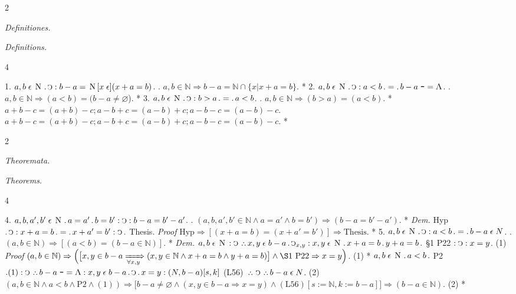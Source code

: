\documentclass{book}
\newcommand{\s}{\switchcolumn} %
\newcommand{\C}{\mathop{\sbox0{$\displaystyle$$\reflectbox{C}$} %
\raisebox{-\height+\ht0-0.05cm}[\ht0][\dp0]{\scalebox{0.8}[0.8]{\copy0}}}\displaylimits} %
\newcommand{\p}{\mathop{\sbox0{$\displaystyle$$.$}
\raisebox{-\height+\ht0}[\ht0][\dp0]{\scalebox{1}[1]{\copy0}}}\displaylimits} %
\newcommand{\pppNoSpace}{\leavevmode\lower0ex\hbox{.}\kern-0.1em\raise0.7ex\hbox{.}\kern-0.1em\lower0ex\hbox{.}} %
\newcommand{\ppp}{\thinspace \pppNoSpace\thinspace} %
\newcommand{\no}{\mathop{\thinspace \scalebox{1.5}{-}}}
\newcommand{\abs}{\mathop{\rotatebox[origin=c]{180}{V}}}
\newcommand{\smallIn}{\ensuremath{\mathrel{\epsilon}}}
\newcommand{\N}{\mathop{\thinspace \text{N} \thinspace}}
\renewcommand{\rightarrow}{\Rightarrow}
\renewcommand{\xrightarrow}{\xRightarrow}
\newcommand\peanoHeadingSmall[1]{ \vspace{0.75cm} \textit{#1} \nopagebreak[4]

\vspace{0.25cm} \nopagebreak[1]}
\newenvironment{translateTwoCol}
               { %
                 \columnratio{0.5, 0.5}
                 \begin{paracol}{2}
                 \newcommand{\LAT}{\switchcolumn[0]*}
                 \newcommand{\ENG}{\switchcolumn[1]}
               }
               { %
                 \let\ENG\undefined
                 \let\LAT\undefined
                 \end{paracol}
               }
\newenvironment{translateFourCol}[4]
               { %
                 \setcolumnwidth{#1\fill/1em, #2\fill/\columnsep, #3\fill/1em, #4\fill}
                 \begin{paracol}{4}
                 \newcommand{\LAT}{\switchcolumn[0]*}
                 \newcommand{\ENG}{\switchcolumn[2]}
               }
               { %
                 \let\ENG\undefined
                 \let\LAT\undefined
                 \end{paracol}
               }
\begin{document}
\begin{translateTwoCol}
\centering
{}
{}
\peanoHeadingSmall{Definitiones.}
\ENG
\peanoHeadingSmall{Definitions.}
\end{translateTwoCol}

\begin{translateFourCol}{0.08}{0.42}{0.08}{0.42}
\raggedright
1. \s $a,b \smallIn \N \p \C : b - a = \N [x \smallIn] (x + a = b)$.
\ENG
1. \s $a,b \in \mathbb{N} \rightarrow b - a = \mathbb{N} \cap \{x | x + a = b \}$.
\LAT
2. \s $a,b \smallIn \N \p \C : a < b \p = \p b - a \no = \abs$.
\ENG
2. \s $a,b \in \mathbb{N} \rightarrow (a < b) = (b - a \neq \varnothing$).
\LAT
3. \s $a,b \smallIn \N \p \C : b > a \p = \p a < b$.
\ENG
3. \s $a,b \in \mathbb{N} \rightarrow (b > a) = (a < b)$.
\LAT
\s $a + b - c = (a + b) - c; a - b + c = (a - b) + c; a - b - c = (a - b) - c$.
\ENG
\s $a + b - c = (a + b) - c; a - b + c = (a - b) + c; a - b - c = (a - b) - c$.
\LAT
\end{translateFourCol}

\begin{translateTwoCol}
\centering
{}
{}
\peanoHeadingSmall{Theoremata.}
\ENG
\peanoHeadingSmall{Theorems.}
\end{translateTwoCol}

\begin{translateFourCol}{0.08}{0.42}{0.08}{0.42}
\raggedright
4. \s $a,b,a',b' \smallIn \N \p a = a' \p b = b' : \C : b - a = b' - a'$.
\ENG
4. \s $(a,b,a',b' \in \mathbb{N} \wedge a = a' \wedge b = b') \rightarrow (b - a = b' - a')$.
\LAT
\emph{Dem.} \s Hyp $\p \C : x + a = b \p = \p x + a' = b' : \C \p$ Thesis.
\ENG
\emph{Proof} \s $\text{Hyp} \rightarrow [(x + a = b) = (x + a' = b')] \rightarrow \text{Thesis}$.
\LAT
5. \s $a,b \smallIn \N \p \C : a < b \p = \p b - a \smallIn N$.
\ENG
5. \s $(a,b \in \mathbb{N}) \rightarrow [(a < b) = (b - a \in \mathbb{N})]$.
\LAT
\emph{Dem.} \s $a,b \smallIn \N : \C \ppp x,y \smallIn b - a \p \C_{x,y} : x, y \smallIn \N \p x + a = b \p y + a = b \p$ \S1 P22 $: \C : x = y$. \hfill (1)
\ENG
\emph{Proof} \s $(a,b \in \mathbb{N}) \rightarrow \Big( \big[ x,y \in b - a \xrightarrow[\forall x,y]{} (x, y \in \mathbb{N} \wedge x + a = b \wedge y + a = b) \big] \wedge \S1\ \text{P22} \rightarrow x = y \Big)$. \hfill (1)
\LAT
\s $a,b \smallIn \N \p a < b \p$ P2 $\p (1) : \C \ppp b - a \no = \abs : x,y \smallIn b - a \p \C \p x = y : (N, b - a) [s,k]$ (L56) $\ppp \C \ppp b - a \smallIn N$. \hfill (2)
\ENG
\s $(a,b \in \mathbb{N} \wedge a < b \wedge \text{P2} \wedge (1)) \rightarrow \Big[ b - a \neq \varnothing \wedge (x,y \in b - a \rightarrow x = y) \wedge (\text{L56})[s:=\mathbb{N},k:=b-a] \Big] \rightarrow (b - a \in \mathbb{N})$. \hfill (2)
\LAT
\end{translateFourCol}
\end{document}
